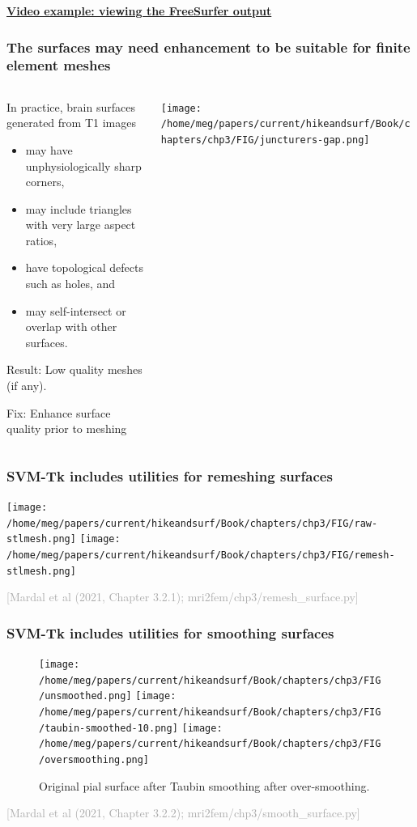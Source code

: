 \documentclass[mathserif, aspectratio=169]{beamer}
\newcommand{\refer}[1]{\begin{flushright}{\tiny \textcolor{darkgray}{[#1]}}\end{flushright}}
\newcommand{\videosection}[2]{\begin{frame} \begin{center} \vspace{3em} \href{#2}{\textcolor{rognesred}{\textbf{#1}}} \end{center} \end{frame}}
\begin{document}
\videosection{Video example: viewing the FreeSurfer output}{}

\begin{frame}
\frametitle{The surfaces may need enhancement to be suitable for finite element meshes}

\begin{columns}
\begin{column}{0.6\textwidth}
In practice, brain surfaces generated from T1 images 
\vspace{-1em}
\begin{itemize}
\item may have unphysiologically sharp corners,   
\item may include triangles with very large aspect ratios, 
\item have topological defects such as holes, and
\item may self-intersect or overlap with other surfaces.   
\end{itemize}

\medskip

\alert{Result:} Low quality meshes (if any). \\

\medskip

\alert{Fix:} Enhance surface quality prior to meshing
\end{column}
\begin{column}{0.4\textwidth}
  \centering
  \texttt{[image: /home/meg/papers/current/hikeandsurf/Book/chapters/chp3/FIG/juncturers-gap.png]}
\end{column}

\end{columns}
\end{frame}


\begin{frame}
  \frametitle{SVM-Tk includes utilities for remeshing surfaces}
  \centering
  \texttt{[image: /home/meg/papers/current/hikeandsurf/Book/chapters/chp3/FIG/raw-stlmesh.png]}
  \texttt{[image: /home/meg/papers/current/hikeandsurf/Book/chapters/chp3/FIG/remesh-stlmesh.png]}
  \refer{Mardal et al (2021, Chapter 3.2.1); mri2fem/chp3/remesh\_surface.py}
\end{frame}


\begin{frame}
  \frametitle{SVM-Tk includes utilities for smoothing surfaces}
  \begin{figure}
  \centering
  \texttt{[image: /home/meg/papers/current/hikeandsurf/Book/chapters/chp3/FIG/unsmoothed.png]}
  \texttt{[image: /home/meg/papers/current/hikeandsurf/Book/chapters/chp3/FIG/taubin-smoothed-10.png]}
  \texttt{[image: /home/meg/papers/current/hikeandsurf/Book/chapters/chp3/FIG/oversmoothing.png]}

  Original pial surface \hspace{3em} after Taubin smoothing \hspace{3em}
after over-smoothing.
  \end{figure}
  \bigskip
  
  \refer{Mardal et al (2021, Chapter 3.2.2); mri2fem/chp3/smooth\_surface.py}
\end{frame}
\end{document}
